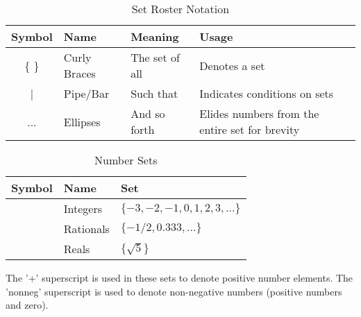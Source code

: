 \documentclass{article}
\begin{document}
\begin{table}[!htbp]
    \centering
    \caption{Set Roster Notation}
    \begin{tabular}{ c l l l }
        \toprule
        Symbol  & Name          & Meaning           & Usage \\
        \midrule
        \{ \}  & Curly Braces  & The set of all    & Denotes a set \\
        |       & Pipe/Bar      & Such that         & Indicates conditions on sets \\
        ...     & Ellipses      & And so forth      & Elides numbers from the entire set for brevity \\
        \bottomrule
    \end{tabular}
    \label{tab:tbl1}
\end{table}

\newpage

\begin{table}[!htbp]
    \centering
    \begin{tabular}{ c l l }
        \toprule
        Symbol  & Name      & Set \\
        \midrule
        \Z      & Integers  & $\{-3,-2,-1,0,1,2,3, ... \}$ \\
        \Q      & Rationals & $\{ -1/2, 0.333, ... \}$ \\
        \R      & Reals     & $\{ \sqrt{5} \}$ \\
        \bottomrule
    \end{tabular}
    \label{tab:tbl2}
    \caption{Number Sets}
\end{table}




The '+' superscript is used in these sets to denote positive number elements.
The 'nonneg' superscript is used to denote non-negative numbers (positive numbers and zero).
\end{document}
